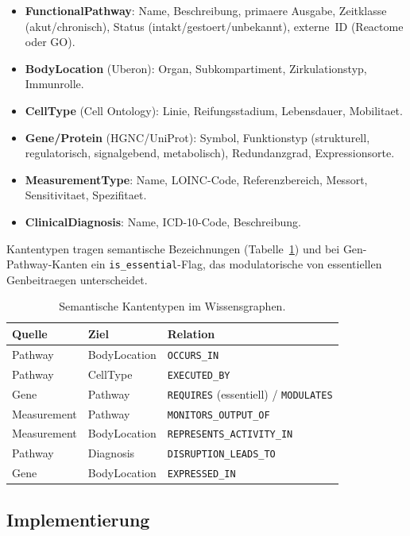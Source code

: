 \documentclass[12pt,a4paper]{article}
\begin{document}
\begin{itemize}
    \item \textbf{FunctionalPathway}: Name, Beschreibung, primaere Ausgabe, Zeitklasse (akut/chronisch), Status (intakt/gestoert/unbekannt), externe~ID (Reactome oder GO).
    \item \textbf{BodyLocation} (Uberon): Organ, Subkompartiment, Zirkulationstyp, Immunrolle.
    \item \textbf{CellType} (Cell Ontology): Linie, Reifungsstadium, Lebensdauer, Mobilitaet.
    \item \textbf{Gene/Protein} (HGNC/UniProt): Symbol, Funktionstyp (strukturell, regulatorisch, signalgebend, metabolisch), Redundanzgrad, Expressionsorte.
    \item \textbf{MeasurementType}: Name, LOINC-Code, Referenzbereich, Messort, Sensitivitaet, Spezifitaet.
    \item \textbf{ClinicalDiagnosis}: Name, ICD-10-Code, Beschreibung.
\end{itemize}

Kantentypen tragen semantische Bezeichnungen (Tabelle~\ref{de:tab:edges}) und bei Gen-Pathway-Kanten ein \texttt{is\_essential}-Flag, das modulatorische von essentiellen Genbeitraegen unterscheidet.

\begin{table}[H]
\centering
\caption{Semantische Kantentypen im Wissensgraphen.}
\label{de:tab:edges}
\begin{tabular}{lll}
\toprule
\textbf{Quelle} & \textbf{Ziel} & \textbf{Relation} \\
\midrule
Pathway & BodyLocation & \texttt{OCCURS\_IN} \\
Pathway & CellType & \texttt{EXECUTED\_BY} \\
Gene & Pathway & \texttt{REQUIRES} (essentiell) / \texttt{MODULATES} \\
Measurement & Pathway & \texttt{MONITORS\_OUTPUT\_OF} \\
Measurement & BodyLocation & \texttt{REPRESENTS\_ACTIVITY\_IN} \\
Pathway & Diagnosis & \texttt{DISRUPTION\_LEADS\_TO} \\
Gene & BodyLocation & \texttt{EXPRESSED\_IN} \\
\bottomrule
\end{tabular}
\end{table}

\subsection*{Implementierung}
\label{de:sec:implementation}
\end{document}
